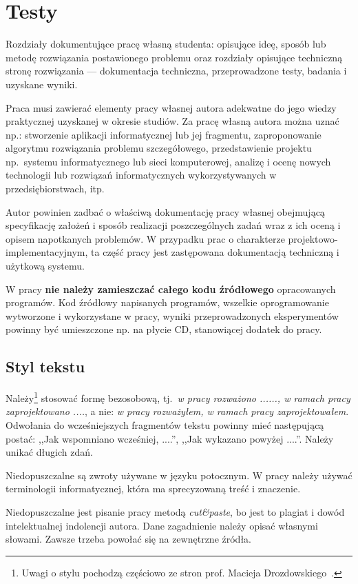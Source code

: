 
\chapter{Testy}

Rozdziały dokumentujące pracę własną studenta: opisujące ideę, sposób lub metodę 
rozwiązania postawionego problemu oraz rozdziały opisujące techniczną stronę rozwiązania 
--- dokumentacja techniczna, przeprowadzone testy, badania i uzyskane wyniki. 

Praca musi zawierać elementy pracy własnej autora adekwatne do jego wiedzy praktycznej uzyskanej w
okresie studiów. Za pracę własną autora można uznać np.: stworzenie aplikacji informatycznej lub jej
fragmentu, zaproponowanie algorytmu rozwiązania problemu szczegółowego, przedstawienie projektu 
np.~systemu informatycznego lub sieci komputerowej, analizę i ocenę nowych technologii lub rozwiązań
informatycznych wykorzystywanych w przedsiębiorstwach, itp. 

Autor powinien zadbać o właściwą dokumentację pracy własnej obejmującą specyfikację założeń i 
sposób realizacji poszczególnych zadań
wraz z ich oceną i opisem napotkanych problemów. W przypadku prac o charakterze 
projektowo-implementacyjnym, ta część pracy jest zastępowana dokumentacją techniczną i użytkową systemu. 

W pracy \textbf{nie należy zamieszczać całego kodu źródłowego} opracowanych programów. Kod źródłowy napisanych
programów, wszelkie oprogramowanie wytworzone i wykorzystane w pracy, wyniki przeprowadzonych
eksperymentów powinny być umieszczone np. na płycie CD, stanowiącej dodatek do pracy.

\section*{Styl tekstu}

Należy\footnote{Uwagi o stylu pochodzą częściowo ze stron prof. Macieja Drozdowskiego~\cite{Drozdowski2006}.} 
stosować formę bezosobową, tj.~\emph{w pracy rozważono ......, 
w ramach pracy zaprojektowano ....}, a nie: \emph{w pracy rozważyłem, w ramach pracy zaprojektowałem}. 
Odwołania do wcześniejszych fragmentów tekstu powinny mieć następującą postać: ,,Jak wspomniano wcześniej, ....'', 
,,Jak wykazano powyżej ....''. Należy unikać długich zdań. 

Niedopuszczalne są zwroty używane w języku potocznym. W pracy należy używać terminologii informatycznej, która ma 
sprecyzowaną treść i znaczenie. 

Niedopuszczalne jest pisanie pracy metodą \emph{cut\&paste}, bo jest to plagiat i dowód intelektualnej indolencji autora.
Dane zagadnienie należy opisać własnymi słowami. Zawsze trzeba powołać się na zewnętrzne źródła. 

